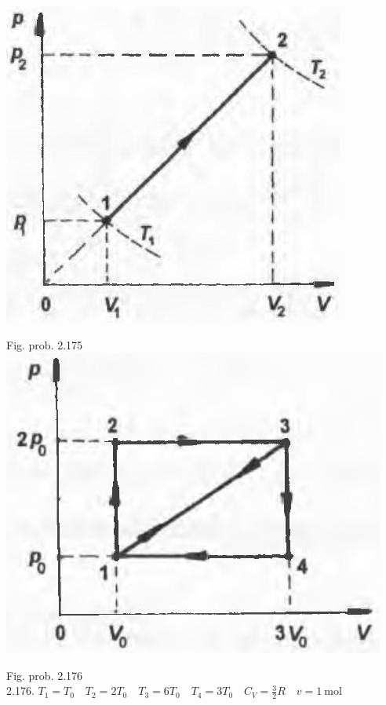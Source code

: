 \documentclass[10pt]{article}
\begin{document}
\begin{center}
\includegraphics[max width=\textwidth]{2025_07_01_5b3ff9fa0d508c8e9f17g-307(1)}
\end{center}

Fig. prob. 2.175\\
\includegraphics[max width=\textwidth, center]{2025_07_01_5b3ff9fa0d508c8e9f17g-307}

Fig. prob. 2.176\\
2.176. $T_{1}=T_{0} \quad T_{2}=2 T_{0} \quad T_{3}=6 T_{0} \quad T_{4}=3 T_{0} \quad C_{V}=\frac{3}{2} R \quad v=1 \mathrm{~mol}$
\end{document}
